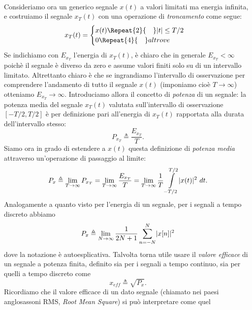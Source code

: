 \documentclass[12pt,oneside,openany]{memoir}
\numberwithin{equation}{subsection}
\DeclarePairedDelimiter{\abs}{\lvert}{\rvert}
\newcommand{\quads}[1]{\Repeat{#1}{\quad}}
\newcommand{\dt}{\ dt}
\begin{document}
\\
Consideriamo ora un generico segnale $x(t)$ a valori limitati ma energia
infinita, e costruiamo il segnale $x_T(t)$ con una operazione di
\textit{troncamento} come segue:
\begin{equation}
	x_T(t) = \begin{cases}
			x(t) \quads{2} \abs{t} \leq T/2\\
			0 \quads{4} altrove
		 \end{cases}
\end{equation}
Se indichiamo con $E_{x_T}$ l'energia di $x_T(t)$, \`e chiaro che in generale
$E_{x_T} < \infty$ poich\`e il segnale \`e diverso da zero e assume valori
finiti solo su di un intervallo limitato. Altrettanto chiaro \`e che se
ingrandiamo l'intervallo di osservazione per comprendere l'andamento di tutto il
segnale $x(t)$ (imponiamo cio\`e $T \rightarrow \infty$) otteniamo
$E_{x_T} \rightarrow \infty$. Introduciamo allora il concetto di
\textit{potenza} di un segnale: la potenza media del segnale $x_T(t)$ valutata
sull'intervallo di osservazione $\left[-T/2, T/2\right]$ \`e per definizione
pari all'energia di $x_T(t)$ rapportata alla durata dell'intervallo stesso:
\begin{equation}
	P_{x_T} \triangleq \frac{E_{x_T}}{T}.
\end{equation}
Siamo ora in grado di estendere a $x(t)$ questa definizione di \textit{potenza
media} attraverso un'operazione di passaggio al limite:
\begin{equation}\label{eq:signal_power}
	P_x \triangleq \lim_{T \rightarrow \infty} P_{x_T} =
	\lim_{T \rightarrow \infty} \frac{E_{x_T}}{T} =
	\lim_{T \rightarrow \infty} \frac{1}{T} \int\displaylimits_{-T/2}^{T/2}
	\abs{x(t)}^2 \dt.
\end{equation}
Analogamente a quanto visto per l'energia di un segnale, per i segnali a tempo
discreto abbiamo
\begin{equation}
	P_x \triangleq \lim_{N \rightarrow \infty} \frac{1}{2N + 1}
	\sum_{n = -N}^{N} \abs{x[n]}^2
\end{equation}
dove la notazione \`e autoesplicativa.
Talvolta torna utile usare il \textit{valore efficace} di un segnale a potenza
finita, definito sia per i segnali a tempo continuo, sia per quelli a tempo
discreto come
\begin{equation}
	x_{eff} \triangleq \sqrt{P_x}.
\end{equation}
Ricordiamo che il valore efficace di un dato segnale (chiamato nei paesi
anglosassoni RMS, \textit{Root Mean Square}) si pu\`o interpretare come quel
\end{document}
